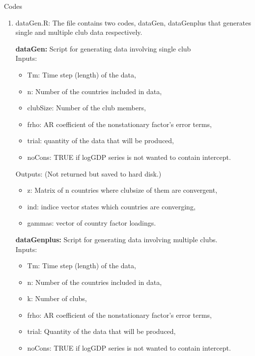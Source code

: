 \documentclass{article}
\begin{document}
\begin{flushleft}
	\large Codes
\end{flushleft}
\begin{enumerate}
	\item dataGen.R: The file contains two codes, dataGen, dataGenplus that generates single and multiple club data respectively.


	 \textbf{dataGen:} Script for generating data involving single club \\
	 
	Inputs:
		 \begin{itemize}
		 	 
		 	\item Tm: Time step (length) of the data,
		 	\item n: Number of the countries included in data,
		 	\item clubSize: Number of the club members,
		 	\item frho: AR coefficient of the nonstationary factor's error terms,
		 	\item trial: quantity of the data that will be produced,
		 	\item noCons: TRUE if logGDP series is not wanted to contain intercept.
		 \end{itemize}
		 
	Outputs: (Not returned but saved to hard disk.)
		 
		 \begin{itemize}
		 \item  z: Matrix of n countries where clubsize of them are convergent,
		 \item  ind: indice vector states which countries are converging,
		 \item  gammas: vector of country factor loadings.  
		 \end{itemize}

		 \textbf{dataGenplus:} Script for generating data involving multiple clubs. \\

	Inputs:
	\begin{itemize}
		
		\item Tm: Time step (length) of the data,
		\item n: Number of the countries included in data,
		\item k: Number of clubs, 
		\item frho: AR coefficient of the nonstationary factor's error terms,
		\item trial: Quantity of the data that will be produced,
		\item noCons: TRUE if logGDP series is not wanted to contain intercept.
	\end{itemize}
	

\end{enumerate}
\end{document}

